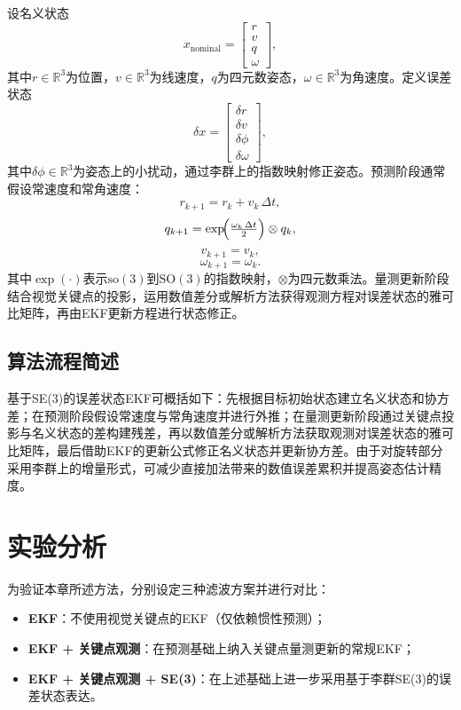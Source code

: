 设名义状态
\begin{equation}
	x_{\text{nominal}} = 
	\begin{bmatrix}
		r \\
		v \\
		q \\
		\omega
	\end{bmatrix},
\end{equation}
其中$r \in \mathbb{R}^3$为位置，$v \in \mathbb{R}^3$为线速度，$q$为四元数姿态，$\omega \in \mathbb{R}^3$为角速度。定义误差状态
\begin{equation}
	\delta x = 
	\begin{bmatrix}
		\delta r \\
		\delta v \\
		\delta \phi \\
		\delta \omega
	\end{bmatrix},
\end{equation}
其中$\delta \phi \in \mathbb{R}^3$为姿态上的小扰动，通过李群上的指数映射修正姿态。预测阶段通常假设常速度和常角速度：
\begin{equation}
	r_{k+1} = r_k + v_k \,\Delta t,
\end{equation}
\begin{equation}
	q_{k+1} = \exp\!\Bigl(\tfrac{\omega_k \,\Delta t}{2}\Bigr)\otimes q_k,
\end{equation}
\begin{equation}
	v_{k+1} = v_k,
\end{equation}
\begin{equation}
	\omega_{k+1} = \omega_k.
\end{equation}
其中$\exp(\cdot)$表示$\mathrm{so}(3)$到$\mathrm{SO}(3)$的指数映射，$\otimes$为四元数乘法。量测更新阶段结合视觉关键点的投影，运用数值差分或解析方法获得观测方程对误差状态的雅可比矩阵，再由EKF更新方程进行状态修正。



\subsection{算法流程简述}
基于SE(3)的误差状态EKF可概括如下：先根据目标初始状态建立名义状态和协方差；在预测阶段假设常速度与常角速度并进行外推；在量测更新阶段通过关键点投影与名义状态的差构建残差，再以数值差分或解析方法获取观测对误差状态的雅可比矩阵，最后借助EKF的更新公式修正名义状态并更新协方差。由于对旋转部分采用李群上的增量形式，可减少直接加法带来的数值误差累积并提高姿态估计精度。

\section{实验分析}
为验证本章所述方法，分别设定三种滤波方案并进行对比：
\begin{itemize}
	\item \textbf{EKF}：不使用视觉关键点的EKF（仅依赖惯性预测）；
	\item \textbf{EKF + 关键点观测}：在预测基础上纳入关键点量测更新的常规EKF；
	\item \textbf{EKF + 关键点观测 + SE(3)}：在上述基础上进一步采用基于李群SE(3)的误差状态表达。
\end{itemize}

